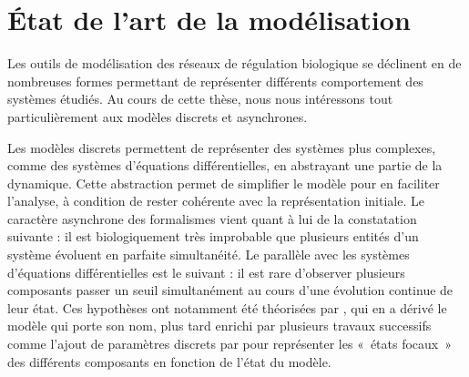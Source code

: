 
\chapter{État de l'art de la modélisation}




Les outils de modélisation des réseaux de régulation biologique se déclinent en de nombreuses
formes permettant de représenter différents comportement des systèmes étudiés.
Au cours de cette thèse, nous nous intéressons tout particulièrement aux modèles discrets
et asynchrones.

Les modèles discrets permettent de représenter des systèmes plus complexes,
comme des systèmes d'équations différentielles,
en abstrayant une partie de la dynamique.
Cette abstraction permet de simplifier le modèle pour en faciliter l'analyse,
à condition de rester cohérente avec la représentation initiale.
Le caractère asynchrone des formalismes vient quant à lui de la constatation suivante :
il est biologiquement très improbable que plusieurs entités d'un système
évoluent en parfaite simultanéité.
Le parallèle avec les systèmes d'équations différentielles est le suivant :
il est rare d'observer plusieurs composants passer un seuil simultanément
au cours d'une évolution continue de leur état.
Ces hypothèses ont notamment été théorisées par ,
qui en a dérivé le modèle qui porte son nom,
plus tard enrichi par plusieurs travaux successifs
comme l'ajout de paramètres discrets par 
pour représenter les «~états focaux~» des différents
composants en fonction de l'état du modèle.

